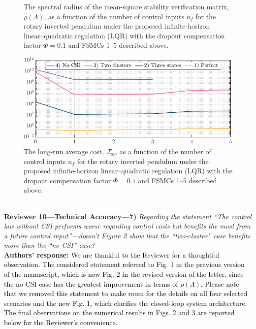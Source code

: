 {\begin{figure}[h!]
\begin{center}
\caption{The spectral radius of the mean-square stability verification matrix, $\rho(\mathit{\Lambda})$, as a function of the number of control inputs $n_f$ for the rotary inverted pendulum under the proposed infinite-horizon linear–quadratic regulation (LQR) with the dropout compensation factor $\mathit{\Phi}=0.1$ and FSMCs 1–5 described above.}\label{fig:stability-coeff-x}
\end{center}
\end{figure}
\begin{figure}[h!]
\begin{center}
\includegraphics[width=0.76\columnwidth]{cost-cntrl-x.pdf}
\caption{The long-run average cost, $J_{\infty}^{\star}$, as a function of the number of control inputs $n_f$ for the rotary inverted pendulum under the proposed infinite-horizon linear–quadratic regulation (LQR) with the dropout compensation factor $\mathit{\Phi}=0.1$ and FSMCs 1–5 described above.}\label{fig:cost-cntrl-x}
\end{center}
\end{figure}
}\\[4mm]
\textbf{Reviewer 10---Technical Accuracy---7)}\textit{ %
Regarding the statement ``The control law without CSI performs worse regarding control costs but benefits the most from a future control input''---doesn't Figure 2 show that the ``two-cluster'' case benefits more than the ``no CSI'' case?}\\[2mm]
\textbf{Authors' response:} \textcolor{black}{We are thankful to the Reviewer for a thoughtful observation. The considered statement referred to Fig. 1 in the previous version of the manuscript, which is now Fig. 2 in the revised version of the letter, since the no CSI case has the greatest improvement in terms of $\rho(\mathit{\Lambda})$. Please note that we removed this statement to make room for the details on all four selected scenarios and the new Fig. 1, which clarifies the closed-loop system architecture. The final observations on the numerical results in Figs. 2 and 3 are reported below for the Reviewer’s convenience.}\\
